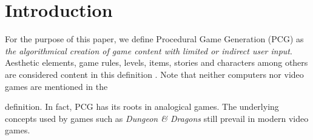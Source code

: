 \documentclass[runningheads,a4paper]{llncs}
\begin{document}
%
%
\section{Introduction}
\label{sec:intro}





For the purpose of this paper, we define Procedural Game Generation
(PCG) as \textit{the algorithmical creation of game content with
  limited or indirect user input}. 
Aesthetic elements, game rules, levels, items, stories and characters
among others are considered content in this definition  
\cite{togelius2011procedural}. %
Note that neither computers nor video games are mentioned in the

definition. In fact, PCG has its roots in analogical games.
The underlying concepts used by games such as \textit{Dungeon \& Dragons} still 
prevail in modern video games. \cite{smith2015analog} 
\end{document}
